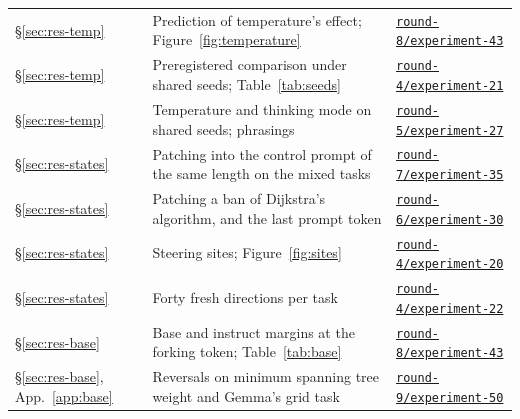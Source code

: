 \documentclass[11pt,letterpaper]{article}
\begin{document}
{\begin{longtable}{@{}L{2.1cm}L{8.9cm}L{4.6cm}@{}}
\S\ref{sec:res-temp} & Prediction of temperature's effect; Figure~\ref{fig:temperature} & \href{https://github.com/ai-inventor-papers/ai-invention-295f8e-prompt-bans-substitute-not-just-subtract/tree/fork/run_jSassd-YWLVC/round-8/experiment-43}{\texttt{round-8/experiment-43}} \\
\S\ref{sec:res-temp} & Preregistered comparison under shared seeds; Table~\ref{tab:seeds} & \href{https://github.com/ai-inventor-papers/ai-invention-295f8e-prompt-bans-substitute-not-just-subtract/tree/fork/run_jSassd-YWLVC/round-4/experiment-21}{\texttt{round-4/experiment-21}} \\
\S\ref{sec:res-temp} & Temperature and thinking mode on shared seeds; phrasings & \href{https://github.com/ai-inventor-papers/ai-invention-295f8e-prompt-bans-substitute-not-just-subtract/tree/fork/run_jSassd-YWLVC/round-5/experiment-27}{\texttt{round-5/experiment-27}} \\
\S\ref{sec:res-states} & Patching into the control prompt of the same length on the mixed tasks & \href{https://github.com/ai-inventor-papers/ai-invention-295f8e-prompt-bans-substitute-not-just-subtract/tree/fork/run_jSassd-YWLVC/round-7/experiment-35}{\texttt{round-7/experiment-35}} \\
\S\ref{sec:res-states} & Patching a ban of Dijkstra's algorithm, and the last prompt token & \href{https://github.com/ai-inventor-papers/ai-invention-295f8e-prompt-bans-substitute-not-just-subtract/tree/fork/run_jSassd-YWLVC/round-6/experiment-30}{\texttt{round-6/experiment-30}} \\
\S\ref{sec:res-states} & Steering sites; Figure~\ref{fig:sites} & \href{https://github.com/ai-inventor-papers/ai-invention-295f8e-prompt-bans-substitute-not-just-subtract/tree/fork/run_jSassd-YWLVC/round-4/experiment-20}{\texttt{round-4/experiment-20}} \\
\S\ref{sec:res-states} & Forty fresh directions per task & \href{https://github.com/ai-inventor-papers/ai-invention-295f8e-prompt-bans-substitute-not-just-subtract/tree/fork/run_jSassd-YWLVC/round-4/experiment-22}{\texttt{round-4/experiment-22}} \\
\S\ref{sec:res-base} & Base and instruct margins at the forking token; Table~\ref{tab:base} & \href{https://github.com/ai-inventor-papers/ai-invention-295f8e-prompt-bans-substitute-not-just-subtract/tree/fork/run_jSassd-YWLVC/round-8/experiment-43}{\texttt{round-8/experiment-43}} \\
\S\ref{sec:res-base}, App.~\ref{app:base} & Reversals on minimum spanning tree weight and Gemma's grid task & \href{https://github.com/ai-inventor-papers/ai-invention-295f8e-prompt-bans-substitute-not-just-subtract/tree/fork/run_jSassd-YWLVC/round-9/experiment-50}{\texttt{round-9/experiment-50}} \\

\end{longtable}}
\end{document}
